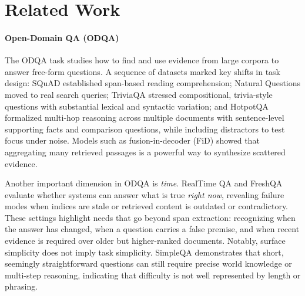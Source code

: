 \clearpage
\section{Related Work}


\paragraph{\textbf{Open-Domain QA (ODQA)}}

The ODQA task studies how to find and use evidence from large corpora to answer free-form questions. A sequence of datasets marked key shifts in task design: SQuAD \cite{rajpurkarSQuAD100000Questions2016} established span-based reading comprehension; Natural Questions \cite{kwiatkowskiNaturalQuestionsBenchmark2019a} moved to real search queries; TriviaQA \cite{joshiTriviaQALargeScale2017} stressed compositional, trivia-style questions with substantial lexical and syntactic variation; and HotpotQA \cite{yangHotpotQADatasetDiverse2018a} formalized multi-hop reasoning across multiple documents with sentence-level supporting facts and comparison questions, while including distractors to test focus under noise. Models such as fusion-in-decoder (FiD) \cite{izacardLeveragingPassageRetrieval2021} showed that aggregating many retrieved passages is a powerful way to synthesize scattered evidence.

Another important dimension in ODQA is \emph{time}. RealTime QA \cite{kasaiRealTimeQAWhats2024} and FreshQA \cite{vuFreshLLMsRefreshingLarge2023} evaluate whether systems can answer what is true \emph{right now}, revealing failure modes when indices are stale or retrieved content is outdated or contradictory. These settings highlight needs that go beyond span extraction: recognizing when the answer has changed, when a question carries a false premise, and when recent evidence is required over older but higher-ranked documents.
Notably, surface simplicity does not imply task simplicity. SimpleQA \cite{weiMeasuringShortformFactuality2024} demonstrates that short, seemingly straightforward questions can still require precise world knowledge or multi-step reasoning, indicating that difficulty is not well represented by length or phrasing. 


